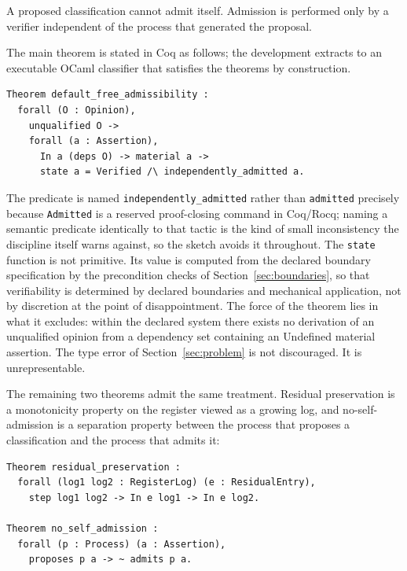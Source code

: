 \documentclass[smallcondensed,envcountsect,natbib]{svjour3}
\newcommand{\state}[1]{\textsf{#1}}
\begin{document}
\begin{theorem}
\label{thm:selfadmission}
A proposed classification cannot admit itself. Admission is performed only by a verifier independent of the process that generated the proposal.
\end{theorem}

The main theorem is stated in Coq as follows; the development extracts to an executable OCaml classifier that satisfies the theorems by construction.

\begin{lstlisting}
Theorem default_free_admissibility :
  forall (O : Opinion),
    unqualified O ->
    forall (a : Assertion),
      In a (deps O) -> material a ->
      state a = Verified /\ independently_admitted a.
\end{lstlisting}

The predicate is named \texttt{independently\_admitted} rather than \texttt{admitted} precisely because \texttt{Admitted} is a reserved proof-closing command in Coq/Rocq; naming a semantic predicate identically to that tactic is the kind of small inconsistency the discipline itself warns against, so the sketch avoids it throughout. The \texttt{state} function is not primitive. Its value is computed from the declared boundary specification by the precondition checks of Section~\ref{sec:boundaries}, so that verifiability is determined by declared boundaries and mechanical application, not by discretion at the point of disappointment. The force of the theorem lies in what it excludes: within the declared system there exists no derivation of an unqualified opinion from a dependency set containing an \state{Undefined} material assertion. The type error of Section~\ref{sec:problem} is not discouraged. It is unrepresentable.

The remaining two theorems admit the same treatment. Residual preservation is a monotonicity property on the register viewed as a growing log, and no-self-admission is a separation property between the process that proposes a classification and the process that admits it:

\begin{lstlisting}
Theorem residual_preservation :
  forall (log1 log2 : RegisterLog) (e : ResidualEntry),
    step log1 log2 -> In e log1 -> In e log2.

Theorem no_self_admission :
  forall (p : Process) (a : Assertion),
    proposes p a -> ~ admits p a.
\end{lstlisting}
\end{document}
